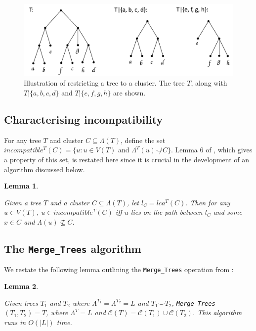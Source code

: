 \documentclass{article}
\newcommand{\compatible}{\smile}
\newcommand{\leafset}{\Lambda}
\newtheorem{incompatibility}{Lemma}
\newtheorem{mergetrees}[incompatibility]{Lemma}
\begin{document}
    \begin{figure}[ht]
        \includegraphics[scale=0.5]{restrictedsubtree}
        \centering
        \caption{Illustration of restricting a tree to a cluster. The tree $T$, along with $T|\{a, b, c, d\}$ and $T|\{e, f, g, h\}$ are shown.}
        \label{fig:restrictedsubtree}
    \end{figure}

    \subsection{Characterising incompatibility}

    For any tree $T$ and cluster $C \subseteq \leafset(T)$, define the set $incompatible^{T}(C) = \{u : u \in V(T) \text{ and } \leafset^{T}(u) \not\compatible C\}$. Lemma 6 of \cite{jansson2018algorithms}, which gives a property of this set, is restated here since it is crucial in the development of an algorithm discussed below.
    \newline

    \begin{incompatibility}
        \label{lem:incompatibility}

        Given a tree $T$ and a cluster $C \subseteq \leafset(T)$, let $l_C = lca^T(C)$. Then for any $u \in V(T)$, $u \in incompatible^{T}(C)$ iff $u$ lies on the path between $l_C$ and some $x \in C$ and $\leafset(u) \not\subseteq C$.
    \end{incompatibility}

    \subsection{The \texttt{Merge\_Trees} algorithm}
    \label{subsec:mergetrees}

    We restate the following lemma outlining the \texttt{Merge\_Trees} operation from \cite{jansson2016improved}:
    \newline

    \begin{mergetrees}
        \label{lem:mergetrees}

        Given trees $T_1$ and $T_2$ where $\leafset^{T_1} = \leafset^{T_2} = L$ and $T_1 \compatible T_2$, \texttt{Merge\_Trees}$(T_1, T_2) = T$, where $\leafset^T = L$ and $\mathcal{C}(T) = \mathcal{C}(T_1) \cup \mathcal{C}(T_2)$. This algorithm runs in $O(|L|)$ time.
    \end{mergetrees}
\end{document}
